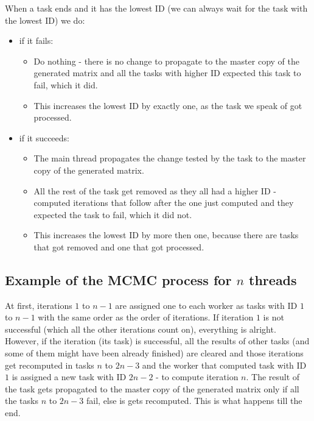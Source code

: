 When a task ends and it has the lowest ID (we can always wait for the task with the lowest ID) we do:
\begin{itemize}
\item if it fails:
\begin{itemize}
\item Do nothing - there is no change to propagate to the master copy of the generated matrix and all the tasks with higher ID expected this task to fail, which it did.
\item This increases the lowest ID by exactly one, as the task we speak of got processed.
\end{itemize}
\item if it succeeds: 
\begin{itemize}
\item The main thread propagates the change tested by the task to the master copy of the generated matrix.
\item All the rest of the task get removed as they all had a higher ID - computed iterations that follow after the one just computed and they expected the task to fail, which it did not.
\item This increases the lowest ID by more then one, because there are tasks that got removed and one that got processed.
\end{itemize}
\end{itemize}

\subsection{Example of the MCMC process for $n$ threads}
At first, iterations $1$ to $n-1$ are assigned one to each worker as tasks with ID $1$ to $n-1$ with the same order as the order of iterations. If iteration $1$ is not successful (which all the other iterations count on), everything is alright. However, if the iteration (its task) is successful, all the results of other tasks (and some of them might have been already finished) are cleared and those iterations get recomputed in tasks $n$ to $2n-3$ and the worker that computed task with ID $1$ is assigned a new task with ID $2n-2$ - to compute iteration $n$. The result of the task gets propagated to the master copy of the generated matrix only if all the tasks $n$ to $2n-3$ fail, else is gets recomputed. This is what happens till the end.

